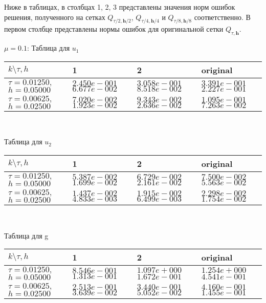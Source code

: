 \documentclass[a4paper]{article}
\theoremstyle{definition}
\numberwithin{equation}{section}
\begin{document}
Ниже в таблицах, в столбцах 1, 2, 3 представлены значения норм ошибок решения, полученного на сетках $Q_{\tau/2,\textbf{h}/2}$, $Q_{\tau/4,\textbf{h}/4}$ и $Q_{\tau/8,\textbf{h}/8}$ соответственно. В первом столбце представлены нормы ошибок для оригинальной сетки $Q_{\tau,\textbf{h}}$.
\newpage
\begin{center}
$\mu=0.1$: Таблица для $u_1$
\begin{tabular}{|p{1.1in}|p{1.2in}|p{1.2in}|p{1.2in}|} \hline
$k\setminus \tau, h $ & 1 & 2 & original \\ \hline

$\tau=0.01250 ,$ $h=0.05000$ &$2.450e-001$ $6.677e-002$ &$3.058e-001$ $8.518e-002$ &$3.391e-001$ $2.227e-001$ \\ \hline
$\tau=0.00625 ,$ $h=0.02500$ &$7.020e-002$ $1.923e-002$ &$9.343e-002$ $2.636e-002$ &$1.095e-001$ $7.263e-002$ \\ \hline
\end{tabular}\\[20pt]
\end{center}
\begin{center}
Таблица для $u_2$
\begin{tabular}{|p{1.1in}|p{1.2in}|p{1.2in}|p{1.2in}|} \hline
$k\setminus \tau, h $ & 1 & 2 & original \\ \hline

$\tau=0.01250 ,$ $h=0.05000$ &$5.387e-002$ $1.699e-002$ &$6.729e-002$ $2.161e-002$ &$7.500e-002$ $5.563e-002$  \\ \hline
$\tau=0.00625 ,$ $h=0.02500$ &$1.437e-002$ $4.833e-003$ &$1.915e-002$ $6.499e-003$ &$2.298e-002$ $1.754e-002$  \\ \hline
\end{tabular}\\[20pt]
\end{center}
\begin{center}
Таблица для g
\begin{tabular}{|p{1.1in}|p{1.2in}|p{1.2in}|p{1.2in}|} \hline
$k\setminus \tau, h $ & 1 & 2 & original \\ \hline

$\tau=0.01250 ,$ $h=0.05000$ &$8.546e-001$ $1.313e-001$ &$1.097e+000$ $1.672e-001$ &$1.254e+000$ $4.541e-001$  \\ \hline
$\tau=0.00625 ,$ $h=0.02500$ &$2.513e-001$ $3.639e-002$ &$3.440e-001$ $5.052e-002$ &$4.160e-001$ $1.455e-001$  \\ \hline
\end{tabular}\\[20pt]
\end{center}
\end{document}
